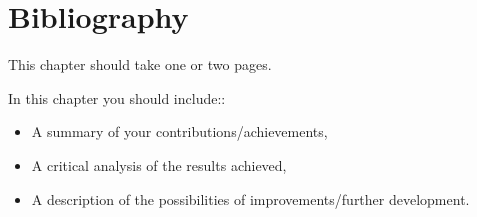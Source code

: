 \chapter{Bibliography}
\pagestyle{fancy}

{\color{blue} This chapter should take one or two pages.\\}

In this chapter you should include::
\begin{itemize}
	\item A summary of your contributions/achievements,
    \item  A critical analysis of the results achieved,
    \item  A description of the possibilities of improvements/further development.
\end{itemize}

